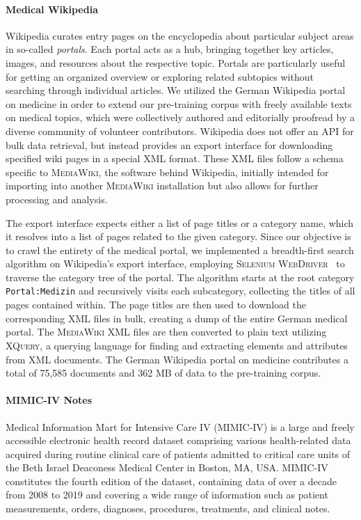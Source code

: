 \paragraph{Medical Wikipedia}
Wikipedia curates entry pages on the encyclopedia about particular subject areas
in so-called \textit{portals}. Each portal acts as a hub, bringing together key
articles, images, and resources about the respective topic. Portals are
particularly useful for getting an organized overview or exploring related
subtopics without searching through individual articles. We utilized the German
Wikipedia portal on medicine in order to extend our pre-training corpus with
freely available texts on medical topics, which were collectively authored and
editorially proofread by a diverse community of volunteer contributors.
Wikipedia does not offer an API for bulk data retrieval, but instead provides an
export interface \cite{wikipediaexport} for downloading specified wiki pages in
a special XML format. These XML files follow a schema specific to
\textsc{MediaWiki}, the software behind Wikipedia, initially intended for
importing into another \textsc{MediaWiki} installation but also allows for
further processing and analysis.

The export interface expects either a list of page titles or a category name,
which it resolves into a list of pages related to the given category. Since our
objective is to crawl the entirety of the medical portal, we implemented a
breadth-first search algorithm on Wikipedia's export interface, employing
\textsc{Selenium WebDriver}~\cite{gojare2015analysis} to traverse the category
tree of the portal. The algorithm starts at the root category
\texttt{Portal:Medizin} and recursively visits each subcategory, collecting the
titles of all pages contained within. The page titles are then used to download
the corresponding XML files in bulk, creating a dump of the entire German
medical portal. The \textsc{MediaWiki} XML files are then converted to plain
text utilizing \textsc{XQuery}, a querying language for finding and extracting
elements and attributes from XML documents. The German Wikipedia portal on
medicine contributes a total of 75,585 documents and 362 MB of data to the
pre-training corpus.

\paragraph{MIMIC-IV Notes}
Medical Information Mart for Intensive Care IV (MIMIC-IV)
\cite{johnson2023mimic} is a large and freely accessible electronic health
record dataset comprising various health-related data acquired during routine
clinical care of patients admitted to critical care units of the Beth Israel
Deaconess Medical Center in Boston, MA, USA. MIMIC-IV constitutes the fourth
edition of the dataset, containing data of over a decade from 2008 to 2019 and
covering a wide range of information such as patient measurements, orders,
diagnoses, procedures, treatments, and clinical notes. 

